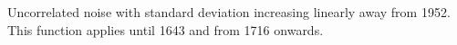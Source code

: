 Uncorrelated noise with standard deviation increasing linearly away from 1952. This function applies until 1643 and from 1716 onwards.